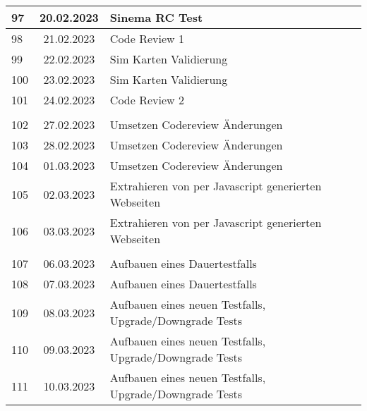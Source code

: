 \begin{longtable}{|l|c|l|}
97  & 20.02.2023    &   Sinema RC Test                                                    \\ \hline 
98  & 21.02.2023    &  Code Review 1                                        \\ \hline 
99  & 22.02.2023    &   Sim Karten Validierung                                                     \\ \hline 
100 & 23.02.2023    &  Sim Karten Validierung                                                    \\ \hline 
101 & 24.02.2023    &  Code Review 2                                    \\ \hline
&               &                                                       \\ \hline  
102 & 27.02.2023    &  Umsetzen Codereview Änderungen                                                     \\ \hline 
103 & 28.02.2023    &  Umsetzen Codereview Änderungen                                                      \\ \hline 
104 & 01.03.2023    &   Umsetzen Codereview Änderungen                                                     \\ \hline 
105 & 02.03.2023    &   Extrahieren von per Javascript generierten Webseiten                                                    \\ \hline 
106 & 03.03.2023    &  Extrahieren von per Javascript generierten Webseiten                                                      \\ \hline
&               &                                                       \\ \hline  
107 & 06.03.2023    &  Aufbauen eines Dauertestfalls                                                        \\ \hline
108 & 07.03.2023    &  Aufbauen eines Dauertestfalls                                                     \\ \hline
109 & 08.03.2023    &  Aufbauen eines neuen Testfalls, Upgrade/Downgrade Tests                                                     \\ \hline
110 & 09.03.2023    & Aufbauen eines neuen Testfalls,  Upgrade/Downgrade Tests                                                        \\ \hline
111 & 10.03.2023    &   Aufbauen eines neuen Testfalls,   Upgrade/Downgrade Tests                                                      \\ \hline

\end{longtable}
